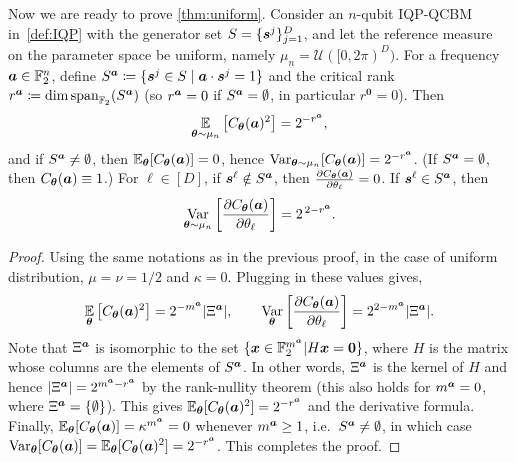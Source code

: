 \documentclass{article}
\theoremstyle{plain}
\theoremstyle{definition}
\theoremstyle{remark}
\begin{document}
Now we are ready to prove \cref{thm:uniform}. Consider an $n$-qubit IQP-QCBM in~\cref{def:IQP} with the generator set $S=\{{\bm{s}^j}\}_{j=1}^D$, and let the reference measure on the parameter space be uniform, namely $\mu_n = \mathcal{U}([0,2\pi)^D)$. For a frequency ${\bm{a}} \in \mathbb{F}_2^n$, define $S^{{\bm{a}}} \coloneqq \{ {\bm{s}^j}\in S \mid {\bm{a}} \cdot {\bm{s}^j} = 1 \}$ and the critical rank $r^{\bm{a}} \coloneqq \dim \operatorname{span}_{\mathbb{F}_2}( S^{{\bm{a}}})$ (so $r^{\bm{a}}=0$ if $S^{\bm{a}}=\emptyset$, in particular $r^{\mathbf 0}=0$). Then
\begin{equation*}
\operatorname*{\mathbb{E}}_{{\bm{\theta}}\sim\mu_n}\big[C_{\bm{\theta}}({\bm{a}})^2\big] = 2^{-r^{\bm{a}}},
\end{equation*}
and if $S^{\bm{a}}\neq\emptyset$, then $\operatorname*{\mathbb{E}}_{{\bm{\theta}}}[C_{\bm{\theta}}({\bm{a}})]=0$, hence $\operatorname*{Var}_{{\bm{\theta}}\sim\mu_n}[C_{\bm{\theta}}({\bm{a}})] = 2^{-r^{\bm{a}}}$. (If $S^{\bm{a}}=\emptyset$, then $C_{\bm{\theta}}({\bm{a}})\equiv 1$.) For $\ell \in [D]$, if ${\bm{s}^\ell} \notin S^{\bm{a}}$, then $ \frac{\partial C_{\bm{\theta}}({\bm{a}})}{\partial \theta_\ell}=0$. If ${\bm{s}^\ell} \in S^{\bm{a}}$, then
\begin{equation*}
\operatorname*{Var}_{{\bm{\theta}}\sim\mu_n} \left[ \frac{\partial C_{\bm{\theta}}({\bm{a}})}{\partial \theta_\ell} \right] = 2^{\,2-r^{\bm{a}}}. \end{equation*}
\begin{proof}
Using the same notations as in the previous proof, in the case of uniform distribution, $\mu = \nu = 1/2$ and $\kappa = 0$. Plugging in these values gives, \begin{equation*}
    \operatorname*{\mathbb{E}}_{\bm{\theta}} \left[ C_{\bm{\theta}}({\bm{a}})^2 \right] = 2^{-m^{\bm{a}}} \abs{\Xi^{\bm{a}}} , \qquad \operatorname*{Var}_{{\bm{\theta}}}\left[\frac{\partial C_{\bm{\theta}}({\bm{a}})}{\partial\theta_\ell}\right]
= 2^{2-m^{\bm{a}}} \abs{\Xi^{\bm{a}}} .
\end{equation*}
Note that $\Xi^{\bm{a}}$ is isomorphic to the set $\{{\bm{x}} \in \mathbb{F}_2^{m^{\bm{a}}} | H {\bm{x}} = \bm{0}\}$, where $H$ is the matrix whose columns are the elements of $S^{\bm{a}}$. In other words, $\Xi^{\bm{a}}$ is the kernel of $H$ and hence $\abs{\Xi^{\bm{a}}} = 2^{m^{\bm{a}}-r^{\bm{a}}}$ by the rank-nullity theorem (this also holds for $m^{\bm{a}}=0$, where $\Xi^{\bm{a}}=\{\emptyset\}$). This gives $\operatorname*{\mathbb{E}}_{\bm{\theta}}[C_{\bm{\theta}}({\bm{a}})^2]=2^{-r^{\bm{a}}}$ and the derivative formula. Finally, $\operatorname*{\mathbb{E}}_{\bm{\theta}}[C_{\bm{\theta}}({\bm{a}})]=\kappa^{m^{\bm{a}}}=0$ whenever $m^{\bm{a}}\geq1$, i.e.\ $S^{\bm{a}}\neq\emptyset$, in which case $\operatorname*{Var}_{\bm{\theta}}[C_{\bm{\theta}}({\bm{a}})]=\operatorname*{\mathbb{E}}_{\bm{\theta}}[C_{\bm{\theta}}({\bm{a}})^2]=2^{-r^{\bm{a}}}$. This completes the proof.
\end{proof}
 
\end{document}
